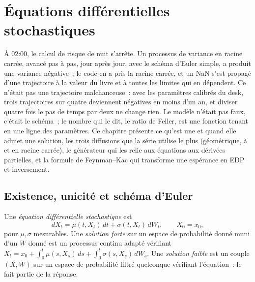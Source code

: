 \chapter{Équations différentielles stochastiques}\label{ch:qm:stochastic-differential-equations}

À 02:00, le calcul de risque de nuit s'arrête. Un processus de variance en racine carrée, avancé
pas à pas, jour après jour, avec le schéma d'Euler simple, a produit une variance négative~; le code en a
pris la racine carrée, et un NaN s'est propagé d'une trajectoire à la valeur du livre et à toutes les limites qui
en dépendent. Ce n'était pas une trajectoire malchanceuse~: avec les paramètres calibrés du desk, trois
trajectoires sur quatre deviennent négatives en moins d'un an, et diviser quatre fois le pas de temps par deux ne change rien.
Le modèle n'était pas faux, c'était le schéma~; le nombre qui le dit, le ratio de Feller, est une
fonction tenant en une ligne des paramètres. Ce chapitre présente ce qu'est une  et quand elle admet une solution, les trois diffusions que la série utilise le plus (géométrique,
à  et en racine carrée), le générateur qui les relie aux équations aux dérivées
partielles, et la formule de Feynman--Kac qui transforme une espérance en EDP et inversement.

\section{Existence, unicité et schéma d'Euler}

\begin{definition}\label{def:qm:stochastic-differential-equations:sde}
Une \emph{équation différentielle stochastique} est
\[
dX_t = \mu(t, X_t)\,dt + \sigma(t, X_t)\,dW_t, \qquad X_0 = x_0,
\]
pour $\mu, \sigma$ mesurables. Une \emph{solution forte} sur un espace de probabilité donné
muni d'un  $W$ donné est un processus continu adapté vérifiant
$X_t = x_0 + \int_0^t\mu(s, X_s)\,ds + \int_0^t\sigma(s, X_s)\,dW_s$. Une \emph{solution
faible} est un couple $(X, W)$ sur un espace de probabilité filtré quelconque vérifiant
l'équation~: le  fait partie de la réponse.
\end{definition}

